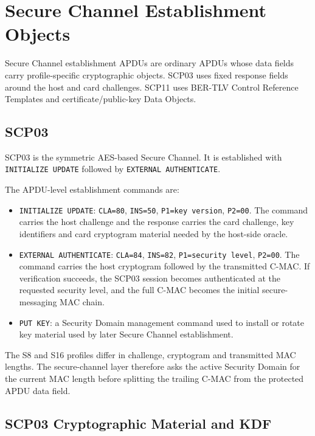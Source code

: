 \section{Secure Channel Establishment Objects}

Secure Channel establishment APDUs are ordinary APDUs whose data fields carry
profile-specific cryptographic objects. SCP03 uses fixed response fields around
the host and card challenges. SCP11 uses BER-TLV Control Reference Templates
and certificate/public-key Data Objects.

\subsection{SCP03}

SCP03 is the symmetric AES-based Secure Channel. It is established with
\texttt{INITIALIZE UPDATE} followed by \texttt{EXTERNAL AUTHENTICATE}.

The APDU-level establishment commands are:
\begin{itemize}
\item \texttt{INITIALIZE UPDATE}:
      \texttt{CLA=80}, \texttt{INS=50}, \texttt{P1=key version},
      \texttt{P2=00}. The command carries the host challenge and
      the response carries the card challenge, key identifiers and card
      cryptogram material needed by the host-side oracle.
\item \texttt{EXTERNAL AUTHENTICATE}:
      \texttt{CLA=84}, \texttt{INS=82}, \texttt{P1=security level},
      \texttt{P2=00}. The command carries the host cryptogram followed by the
      transmitted C-MAC. If verification succeeds, the SCP03 session becomes
      authenticated at the requested security level, and the full C-MAC becomes
      the initial secure-messaging MAC chain.
\item \texttt{PUT KEY}: a Security Domain management command used to install
      or rotate key material used by later Secure Channel establishment.
\end{itemize}

The S8 and S16 profiles differ in challenge, cryptogram and transmitted MAC
lengths. The secure-channel layer therefore asks the active Security Domain
for the current MAC length before splitting the trailing C-MAC from the
protected APDU data field.

\subsection{SCP03 Cryptographic Material and KDF}


